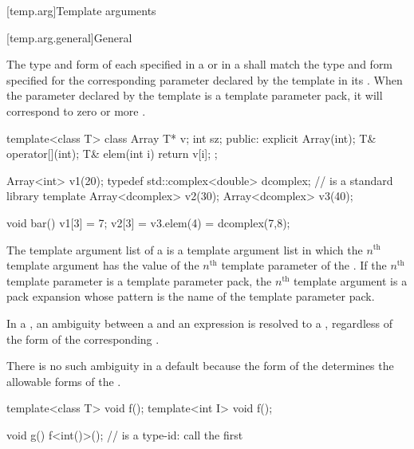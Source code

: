 [temp.arg]{Template arguments}

[temp.arg.general]{General}

\pnum
{}%
The type and form of each  specified
in a  or
in a 
shall match the type and form specified for the corresponding
parameter declared by the template in its
.
When the parameter declared by the template is a template
parameter pack, it will correspond to zero or more
.
\begin{example}
\begin{codeblock}
template<class T> class Array {
  T* v;
  int sz;
public:
  explicit Array(int);
  T& operator[](int);
  T& elem(int i) { return v[i]; }
};

Array<int> v1(20);
typedef std::complex<double> dcomplex;  //  is a standard library template
Array<dcomplex> v2(30);
Array<dcomplex> v3(40);

void bar() {
  v1[3] = 7;
  v2[3] = v3.elem(4) = dcomplex(7,8);
}
\end{codeblock}
\end{example}

\pnum
The template argument list of a  is
a template argument list in which the $n^\text{th}$ template argument
has the value of
the $n^\text{th}$ template parameter of the .
If the $n^\text{th}$ template parameter is
a template parameter pack,
the $n^\text{th}$ template argument is a pack expansion
whose pattern is the name of the template parameter pack.

\pnum
In a
,
an ambiguity between a
and an expression is resolved to a
,
regardless of the form of the corresponding
.
\begin{footnote}
There is no such ambiguity in a default
because the form of the
determines the allowable forms of the
.
\end{footnote}
\begin{example}
\begin{codeblock}
template<class T> void f();
template<int I> void f();

void g() {
  f<int()>();       //  is a type-id: call the first 
}
\end{codeblock}
\end{example}

